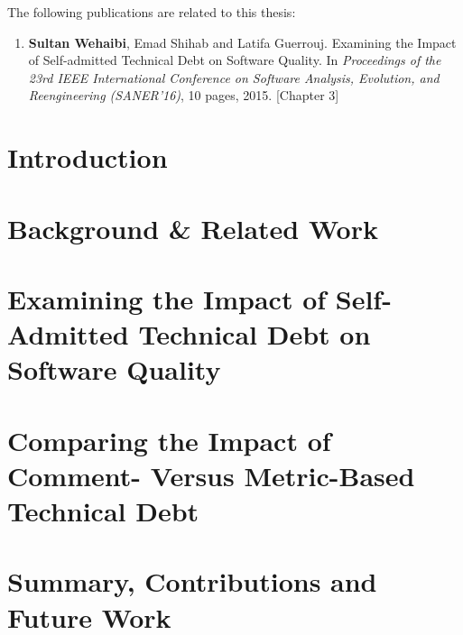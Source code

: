 \documentclass[12pt]{report}
\begin{document}
\begin{publications}

The following publications are related to this thesis:

\begin{enumerate}

\item \textbf{Sultan Wehaibi}, Emad Shihab and Latifa Guerrouj. Examining the Impact of Self-admitted Technical Debt on Software Quality. In \textit{Proceedings of the 23rd IEEE International Conference on Software Analysis, Evolution, and Reengineering (SANER’16)}, 10 pages, 2015. [Chapter 3]


\end{enumerate}

\end{publications}

\chapter{Introduction}
\label{introduction}



\chapter{Background \& Related Work}
\label{literature_review}


\chapter{Examining the Impact of Self-Admitted Technical Debt on Software Quality}
\label{chapter3}


\chapter{Comparing the Impact of Comment- Versus Metric-Based Technical Debt}
\label{chapter4}


\chapter{Summary, Contributions and Future Work}
\label{conclusion}



\begin{appendices}
	\label{appendix}
	
\end{appendices}

  

\end{document}
